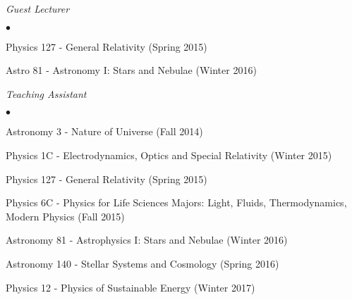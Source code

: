 \documentclass[margin, line]{res}
\newenvironment{list2}{
  \begin{list}{$\bullet$}{%
      \setlength{\itemsep}{0in}
      \setlength{\parsep}{0in} \setlength{\parskip}{0in}
      \setlength{\topsep}{0in} \setlength{\partopsep}{0in} 
      \setlength{\leftmargin}{0.2in}}}{\end{list}}
\begin{document}
\begin{resume}
{\em Guest Lecturer} \hfill {\bf}\\
\begin{list2}
	\item Physics 127 - General Relativity (Spring 2015)
	\item Astro 81 - Astronomy I: Stars and Nebulae (Winter 2016)
\end{list2}
	
{\em Teaching Assistant} \hfill {}\\
\begin{list2}
	\item Astronomy 3 - Nature of Universe (Fall 2014)
	\item Physics 1C - Electrodynamics, Optics and Special Relativity (Winter 2015)
	\item Physics 127 - General Relativity (Spring 2015)
	\item Physics 6C - Physics for Life Sciences Majors: Light, Fluids, Thermodynamics, Modern Physics (Fall 2015)
	\item Astronomy 81 - Astrophysics I: Stars and Nebulae (Winter 2016)
	\item Astronomy 140 - Stellar Systems and Cosmology (Spring 2016)
	\item Physics 12 - Physics of Sustainable Energy (Winter 2017)
\end{list2}







\end{resume}
\end{document}

